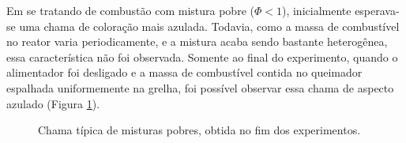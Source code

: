 Em se tratando de combustão com mistura pobre ($\Phi < 1$), inicialmente esperava-se uma chama de coloração mais azulada. Todavia, como a massa de combustível no reator varia periodicamente, e a mistura acaba sendo bastante heterogênea, essa característica não foi observada. Somente ao final do experimento, quando o alimentador foi desligado e a massa de combustível contida no queimador espalhada uniformemente na grelha, foi possível observar essa chama de aspecto azulado (Figura \ref{fig:chamaazul}).

\begin{figure}[!ht]
	\centering
	\caption{Chama típica de misturas pobres, obtida no fim dos experimentos.}
	\label{fig:chamaazul}
\end{figure}

